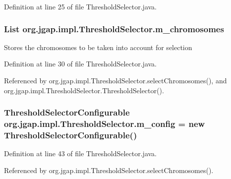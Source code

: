 Definition at line 25 of file Threshold\-Selector.\-java.

\hypertarget{classorg_1_1jgap_1_1impl_1_1_threshold_selector_a905254461fabd1a828e42c639bd5cbfb}{
\subsubsection[{m\-\_\-chromosomes}]{\setlength{\rightskip}{0pt plus 5cm}List org.\-jgap.\-impl.\-Threshold\-Selector.\-m\-\_\-chromosomes\hspace{0.3cm}{\ttfamily [private]}}}\label{classorg_1_1jgap_1_1impl_1_1_threshold_selector_a905254461fabd1a828e42c639bd5cbfb}
Stores the chromosomes to be taken into account for selection 

Definition at line 30 of file Threshold\-Selector.\-java.



Referenced by org.\-jgap.\-impl.\-Threshold\-Selector.\-select\-Chromosomes(), and org.\-jgap.\-impl.\-Threshold\-Selector.\-Threshold\-Selector().

\hypertarget{classorg_1_1jgap_1_1impl_1_1_threshold_selector_a389543dd89814de9ac7aae9225f0128f}{
\subsubsection[{m\-\_\-config}]{\setlength{\rightskip}{0pt plus 5cm}Threshold\-Selector\-Configurable org.\-jgap.\-impl.\-Threshold\-Selector.\-m\-\_\-config = new Threshold\-Selector\-Configurable()\hspace{0.3cm}{\ttfamily [private]}}}\label{classorg_1_1jgap_1_1impl_1_1_threshold_selector_a389543dd89814de9ac7aae9225f0128f}


Definition at line 43 of file Threshold\-Selector.\-java.



Referenced by org.\-jgap.\-impl.\-Threshold\-Selector.\-select\-Chromosomes().

